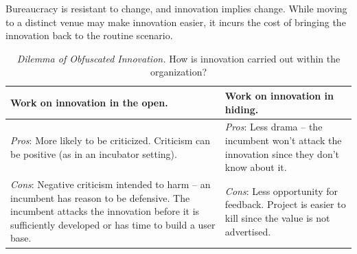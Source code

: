 Bureaucracy is resistant to change, and innovation implies change. While moving to a distinct venue may make innovation easier, it incurs the cost of bringing the innovation back to the routine scenario.

\begin{center}
\begin{table}[H] %
\begin{tabular}{ | m{\dilemmatablewidth}| m{\dilemmatablewidth} | } 
  \hline
  \textbf{Work on innovation in the open.} &
  \textbf{Work on innovation in hiding.} \\
  \hline
  \textit{Pros}: More likely to be criticized. Criticism can be positive (as in an incubator setting).& 
  \textit{Pros}: Less drama -- the incumbent won't attack the innovation since they don't know about it. \\
  \hline
  \textit{Cons}: Negative criticism intended to harm -- an incumbent has reason to be defensive. The incumbent attacks the innovation before it is sufficiently developed or has time to build a user base. & 
  \textit{Cons}: Less opportunity for feedback. Project is easier to kill since the value is not advertised.\\
  \hline
\end{tabular}
\caption{
\textit{Dilemma of Obfuscated Innovation.}
How is innovation carried out within the organization?
}
\label{table:innovate-open-obscure}
\end{table}
\end{center}



